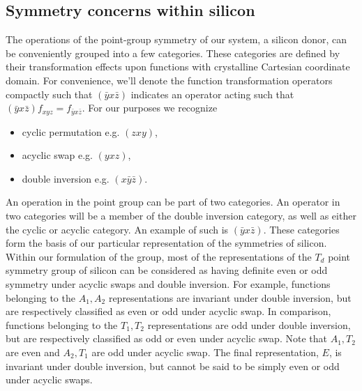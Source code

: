 


%

\subsection{Symmetry concerns within silicon}
\label{subsection:symm_silicon}

The operations of the point-group symmetry of our system, a silicon donor, can
be conveniently grouped into a few categories. These categories are defined by
their transformation effects upon functions with crystalline Cartesian
coordinate domain. For convenience, we'll denote the function transformation
operators compactly such that $\left(\bar{y}x\bar{z}\right)$ indicates an
operator acting such that $\left(\bar{y}x\bar{z}\right) f_{xyz} =
f_{\bar{y}x\bar{z}}$. For our purposes we recognize 
\begin{itemize}
  \item cyclic permutation e.g. $\left(zxy\right)$,
  \item acyclic swap e.g. $\left(yxz\right)$,
  \item double inversion e.g. $\left(x\bar{y}\bar{z}\right)$.
\end{itemize}
An operation in the point group can be part of two categories. An operator in
two categories will be a member of the double inversion category, as well as
either the cyclic or acyclic category. An example of such is
$\left(\bar{y}x\bar{z}\right)$. These categories form the basis of our
particular representation of the symmetries of silicon. Within our formulation
of the group, most of the representations of the $T_{d}$ point symmetry group of
silicon can be considered as having definite even or odd symmetry under acyclic
swaps and double inversion. For example, functions belonging to the $A_{1},
A_{2}$ representations are invariant under double inversion, but are
respectively classified as even or odd under acyclic swap. In comparison,
functions belonging to the $T_{1}, T_{2}$ representations are odd under double
inversion, but are respectively classified as odd or even under acyclic swap.
Note that $A_{1}, T_{2}$ are even and $A_{2}, T_{1}$ are odd under acyclic swap. The final representation, $E$, is invariant under double inversion, but cannot be said to be simply even or odd under acyclic swaps. 

